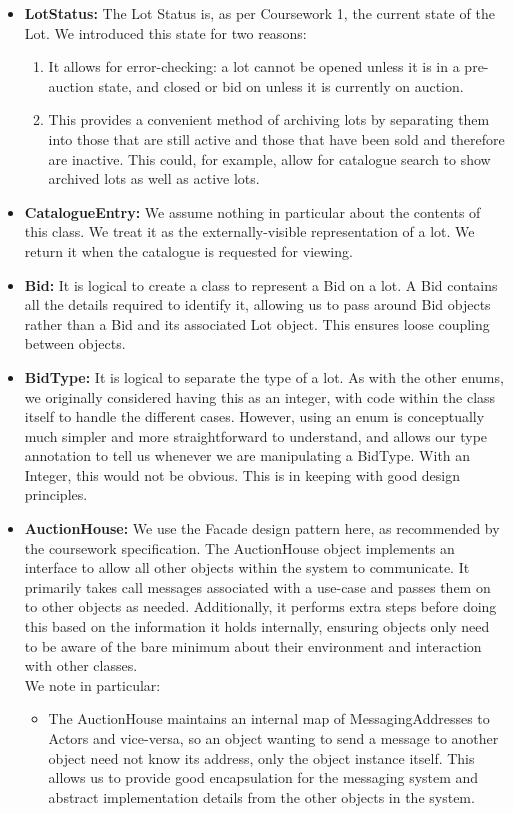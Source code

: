 \documentclass[titlepage, 12pt]{extarticle}
\begin{document}
\begin{itemize}
\item {\bf LotStatus: } The Lot Status is, as per Coursework 1, the current state of the Lot. We introduced this state for two reasons:
  \begin{enumerate}
    \item It allows for error-checking: a lot cannot be opened unless it is in a pre-auction state, and closed or bid on unless it is currently on auction.
    \item This provides a convenient method of archiving lots by separating them into those that are still active and those that have been sold and therefore are inactive. This could, for example, allow for catalogue search to show archived lots as well as active lots.
  \end{enumerate}
\item {\bf CatalogueEntry: } We assume nothing in particular about the contents of this class. We treat it as the externally-visible representation of a lot. We return it when the catalogue is requested for viewing. 
\item {\bf Bid: } It is logical to create a class to represent a Bid on a lot. A Bid contains all the details required to identify it, allowing us to pass around Bid objects rather than a Bid and its associated Lot object. This ensures loose coupling between objects.
\item {\bf BidType: } It is logical to separate the type of a lot. As with the other enums, we originally considered having this as an integer, with code within the class itself to handle the different cases. However, using an enum is conceptually much simpler and more straightforward to understand, and allows our type annotation to tell us whenever we are manipulating a BidType. With an Integer, this would not be obvious. This is in keeping with good design principles.
\item {\bf AuctionHouse: } We use the Facade design pattern here, as recommended by the coursework specification. The AuctionHouse object implements an interface to allow all other objects within the system to communicate. It primarily takes call messages associated with a use-case and passes them on to other objects as needed. Additionally, it performs extra steps before doing this based on the information it holds internally, ensuring objects only need to be aware of the bare minimum about their environment and interaction with other classes.
  \\ We note in particular:
  \begin{itemize}
    \item The AuctionHouse maintains an internal map of MessagingAddresses to Actors and vice-versa, so an object wanting to send a message to another object need not know its address, only the object instance itself. This allows us to provide good encapsulation for the messaging system and abstract implementation details from the other objects in the system.

\end{itemize}
\end{itemize}
\end{document}
